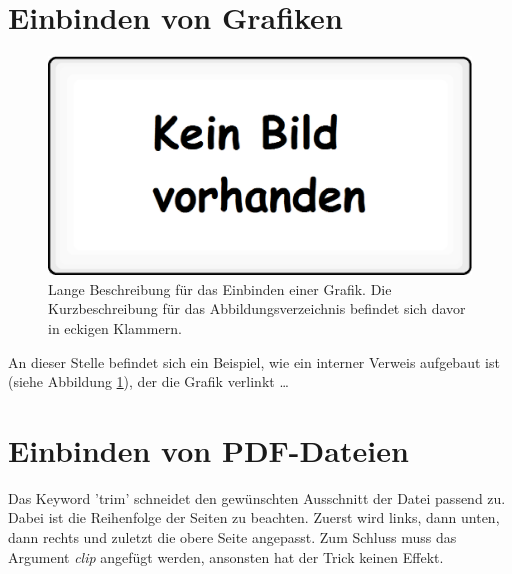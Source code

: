 \section{Einbinden von Grafiken}
\label{sec:EinbindenVonGrafiken}

\FloatBarrier
\begin{figure}[htb]
  \centering  
  \includegraphics[scale=0.3]{img/kein_bild_vorhanden.eps}
  \caption[Beispiel für das Einbinden einer Grafik.]{Lange Beschreibung für das Einbinden einer Grafik. Die Kurzbeschreibung für das Abbildungsverzeichnis befindet sich davor in eckigen Klammern.} 
  \label{fig:kein_bild_vorhanden}
\end{figure}

An dieser Stelle befindet sich ein Beispiel, wie ein interner Verweis aufgebaut ist (siehe Abbildung \ref{fig:kein_bild_vorhanden}), der die Grafik verlinkt \dots

\section{Einbinden von PDF-Dateien}
\label{sec:PDFeinfuegen}
Das Keyword 'trim' schneidet den gewünschten Ausschnitt der Datei passend zu. Dabei ist die Reihenfolge der Seiten zu beachten. Zuerst wird links, dann unten, dann rechts und zuletzt die obere Seite angepasst. Zum Schluss muss das Argument \textit{clip} angefügt werden, ansonsten hat der Trick keinen Effekt.

